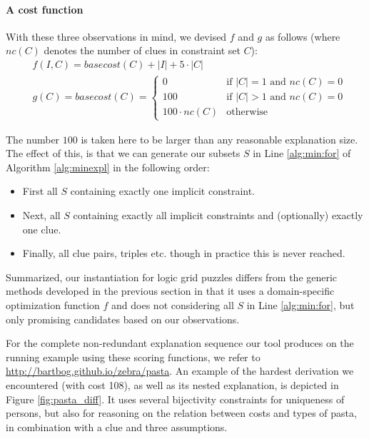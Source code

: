 \paragraph{A cost function}
With these three observations in mind, we devised $f$ and $g$ as follows (where $nc(C)$ denotes the number of clues in constraint set $C$): \label{sec:cost}
\begin{align*}&f(I,C) = basecost(C) + |I| + 5\cdot|C|\\
&g(C) = basecost(C) = \left\{\begin{array}{ll}
                               0 & \text{if $|C|=1$ and $nc(C) = 0$}\\
                               100 & \text{if $|C|>1$ and $nc(C)=0$}\\
                               100\cdot nc(C) & \text{otherwise}
                              \end{array}\right.
                              \end{align*}
                              
The number $100$ is taken here to be larger than any reasonable explanation size. 
The effect of this,  is that we can generate our subsets $S$ in Line \ref{alg:min:for}
 of Algorithm \ref{alg:minexpl} in the following order:
\begin{itemize}
 \item First all $S$ containing exactly one implicit constraint.
 \item Next, all $S$ containing exactly all implicit constraints and (optionally) exactly one clue.
 \item Finally, all clue pairs, triples etc. though in practice this is never reached.
\end{itemize}
Summarized, our instantiation for logic grid puzzles differs from the generic methods developed in the previous section in that it uses a domain-specific optimization function $f$ and does not considering all $S$ in Line \ref{alg:min:for}, but only promising candidates based on our observations.

For the complete non-redundant explanation sequence our tool produces on the running example using these scoring functions, we refer to \url{http://bartbog.github.io/zebra/pasta}. An example of the hardest derivation we encountered (with cost 108), as well as its nested explanation, is depicted in Figure \ref{fig:pasta_diff}. It uses several bijectivity constraints for uniqueness of persons, but also for reasoning on the relation between costs and types of pasta, in combination with a clue and three assumptions.

